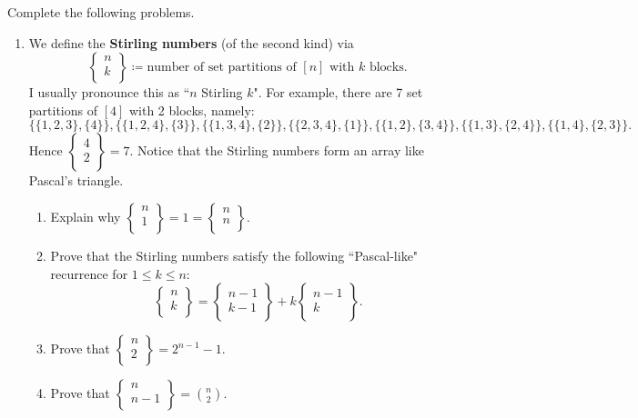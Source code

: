 \documentclass[11pt]{article}%
\theoremstyle{definition}
\newcommand{\stirling}[2]{
  \displaystyle \left\{\begin{matrix}#1  \\#2  \\ \end{matrix}\right\}}
\begin{document}
Complete the following problems. 
\begin{enumerate}
	
\item We define the \textbf{Stirling numbers} (of the second kind) via
\[
\stirling{n}{k}\coloneqq \text{number of set partitions of }[n]\text{ with }k\text{ blocks}.
\]
I usually pronounce this as ``$n$ Stirling $k$". For example, there are 7 set partitions of $[4]$ with 2 blocks, namely:
\[
\{\{1,2,3\},\{4\}\}, \{\{1,2,4\},\{3\}\}, \{\{1,3,4\},\{2\}\}, \{\{2,3,4\},\{1\}\}, \{\{1,2\},\{3,4\}\}, \{\{1,3\},\{2,4\}\}, \{\{1,4\},\{2,3\}\}.  
\]
Hence $\stirling{4}{2}=7$. Notice that the Stirling numbers form an array like Pascal's triangle. 
\begin{enumerate}
\item Explain why $\stirling{n}{1}=1=\stirling{n}{n}$.
\item Prove that the Stirling numbers satisfy the following ``Pascal-like" recurrence for $1\leq k\leq n$:
\[
\stirling{n}{k}=\stirling{n-1}{k-1}+k\stirling{n-1}{k}.
\]
\item Prove that $\stirling{n}{2}=2^{n-1}-1$.
\item Prove that $\stirling{n}{n-1}=\binom{n}{2}$.
\end{enumerate}


\end{enumerate}
\end{document}

